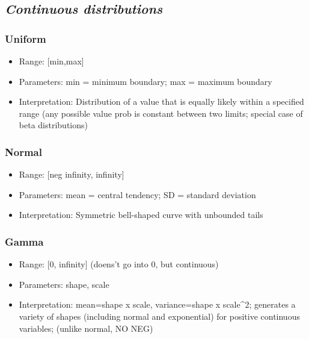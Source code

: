 \documentclass[]{article}
\providecommand{\tightlist}{%
  \setlength{\itemsep}{0pt}\setlength{\parskip}{0pt}}
\begin{document}
\subsection{\texorpdfstring{\textbf{\emph{Continuous
distributions}}}{Continuous distributions}}\label{continuous-distributions}

\subsubsection{\texorpdfstring{\textbf{Uniform}}{Uniform}}\label{uniform}

\begin{itemize}
\tightlist
\item
  Range: {[}min,max{]}
\item
  Parameters: min = minimum boundary; max = maximum boundary
\item
  Interpretation: Distribution of a value that is equally likely within
  a specified range (any possible value prob is constant between two
  limits; special case of beta distributions)
\end{itemize}

\subsubsection{\texorpdfstring{\textbf{Normal}}{Normal}}\label{normal}

\begin{itemize}
\tightlist
\item
  Range: {[}neg infinity, infinity{]}
\item
  Parameters: mean = central tendency; SD = standard deviation
\item
  Interpretation: Symmetric bell-shaped curve with unbounded tails
\end{itemize}

\subsubsection{\texorpdfstring{\textbf{Gamma}}{Gamma}}\label{gamma}

\begin{itemize}
\tightlist
\item
  Range: {[}0, infinity{]} (doens't go into 0, but continuous)
\item
  Parameters: shape, scale
\item
  Interpretation: mean=shape x scale, variance=shape x scale\^{}2;
  generates a variety of shapes (including normal and exponential) for
  positive continuous variables; (unlike normal, NO NEG)
\end{itemize}
\end{document}
